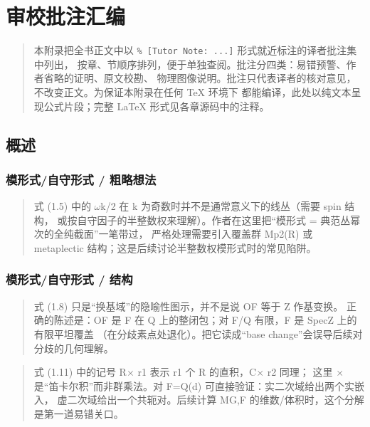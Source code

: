 \chapter{审校批注汇编}\label{app:notes}

\begin{quote}
\small
本附录把全书正文中以 \texttt{\% [Tutor Note: ...]} 形式就近标注的译者批注集中列出，
按章、节顺序排列，便于单独查阅。批注分四类：易错预警、作者省略的证明、原文校勘、
物理图像说明。批注只代表译者的核对意见，不改变正文。为保证本附录在任何 TeX 环境下
都能编译，此处以纯文本呈现公式片段；完整 LaTeX 形式见各章源码中的注释。
\end{quote}

\section{概述}
\subsection*{模形式/自守形式 / 粗略想法}
\begin{quote}\small
式 (1.5) 中的 $\omega$k/2 在 k 为奇数时并不是通常意义下的线丛（需要 spin 结构， 或按自守因子的半整数权来理解）。作者在这里把“模形式 = 典范丛幂次的全纯截面”一笔带过， 严格处理需要引入覆盖群 Mp2(R) 或 metaplectic 结构；这是后续讨论半整数权模形式时的常见陷阱。
\end{quote}

\subsection*{模形式/自守形式 / 结构}
\begin{quote}\small
式 (1.8) 只是“换基域”的隐喻性图示，并不是说 OF 等于 Z 作基变换。 正确的陈述是：OF 是 F 在 Q 上的整闭包；对 F/Q 有限，F 是 SpecZ 上的有限平坦覆盖 （在分歧素点处退化）。把它读成“base change”会误导后续对分歧的几何理解。
\end{quote}

\begin{quote}\small
式 (1.11) 中的记号 R$\times$ r1 表示 r1 个 R 的直积，C$\times$ r2 同理； 这里 $\times$ 是“笛卡尔积”而非群乘法。对 F=Q(d) 可直接验证：实二次域给出两个实嵌入， 虚二次域给出一个共轭对。后续计算 MG,F 的维数/体积时，这个分解是第一道易错关口。
\end{quote}

